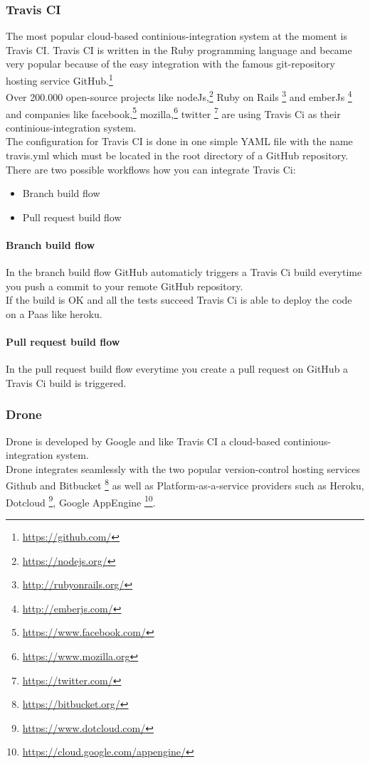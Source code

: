 \subsubsection{Travis CI}
The most popular cloud-based continious-integration system at the moment is Travis CI.
Travis CI is written in the Ruby programming language and became very popular because of the easy integration with the famous git-repository hosting service GitHub.\footnote{\url{https://github.com/}}\\
Over 200.000 open-source projects like nodeJs,\footnote{\url{https://nodejs.org/}}
 Ruby on Rails \footnote{\url{http://rubyonrails.org/}}
and emberJs \footnote{\url{http://emberjs.com/}}
and companies like facebook,\footnote{\url{https://www.facebook.com/}}
 mozilla,\footnote{\url{https://www.mozilla.org}}
 twitter \footnote{\url{https://twitter.com/}}
are using Travis Ci as their continious-integration system.\\
The configuration for Travis CI is done in one simple YAML file with the name travis.yml 
which must be located in the root directory of a GitHub repository.
There are two possible workflows how you can integrate Travis Ci:
\begin{itemize} 
    \item Branch build flow
    \item Pull request build flow
\end{itemize}
\paragraph{Branch build flow}
In the branch build flow GitHub automaticly triggers a Travis Ci build everytime you 
push a commit to your remote GitHub repository.\\
If the build is OK and all the tests succeed Travis Ci is able to deploy the 
code on a Paas like heroku.
\paragraph{Pull request build flow}
In the pull request build flow everytime you create a pull request on GitHub a Travis Ci build is triggered.

\subsubsection{Drone}

Drone is developed by Google and like Travis CI a cloud-based continious-integration system.\\
Drone integrates seamlessly with the two popular version-control hosting services 
Github and Bitbucket \footnote{\url{https://bitbucket.org/}}
as well as Platform-as-a-service providers such as Heroku, Dotcloud \footnote{\url{https://www.dotcloud.com/}},
Google AppEngine  \footnote{\url{https://cloud.google.com/appengine/}}.

